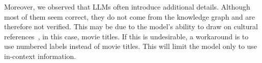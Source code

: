 Moreover, we observed that LLMs often introduce additional details. Although most of them seem correct, they do not come from the knowledge graph and are therefore not verified. This may be due to the model's ability to draw on cultural references~\cite{reynolds2021prompt}, in this case, movie titles. If this is undesirable, a workaround is to use numbered labels instead of movie titles. This will limit the model only to use in-context information.



